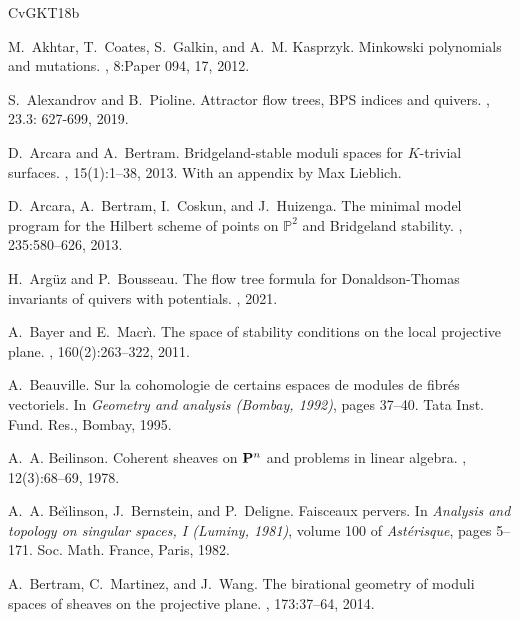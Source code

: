 \documentclass[12pt, a4paper]{amsart}
\begin{document}
\begin{thebibliography}{CvGKT18b}

M.~Akhtar, T.~Coates, S.~Galkin, and A.~M. Kasprzyk.
\newblock Minkowski polynomials and mutations.
, 8:Paper 094,
  17, 2012.
  
  
S.~Alexandrov and B.~Pioline.
\newblock Attractor flow trees, {BPS} indices and quivers.
, 23.3: 627-699, 2019.
  

 
D.~Arcara and A.~Bertram.
\newblock Bridgeland-stable moduli spaces for {$K$}-trivial surfaces.
, 15(1):1--38, 2013.
\newblock With an appendix by Max Lieblich.

D.~Arcara, A.~Bertram, I.~Coskun, and J.~Huizenga.
\newblock The minimal model program for the {H}ilbert scheme of points on
  {$\mathbb{P}^2$} and {B}ridgeland stability.
, 235:580--626, 2013.

H.~Arg{\"u}z and P.~Bousseau.
\newblock The flow tree formula for Donaldson-Thomas invariants of quivers with potentials.
, 2021.



A.~Bayer and E.~Macr\`\i.
\newblock The space of stability conditions on the local projective plane.
, 160(2):263--322, 2011.

A.~Beauville.
\newblock Sur la cohomologie de certains espaces de modules de fibr\'es
  vectoriels.
\newblock In {\em Geometry and analysis ({B}ombay, 1992)}, pages 37--40. Tata
  Inst. Fund. Res., Bombay, 1995.

A.~A. Beilinson.
\newblock Coherent sheaves on {${\bf P}\sp{n}$} and problems in linear algebra.
, 12(3):68--69, 1978.


A.~A. Be\u{\i}linson, J.~Bernstein, and P.~Deligne.
\newblock Faisceaux pervers.
\newblock In {\em Analysis and topology on singular spaces, {I} ({L}uminy,
  1981)}, volume 100 of {\em Ast\'{e}risque}, pages 5--171. Soc. Math. France,
  Paris, 1982.
  
A.~Bertram, C.~Martinez, and J.~Wang.
\newblock The birational geometry of moduli spaces of sheaves on the projective
  plane.
, 173:37--64, 2014.



\end{thebibliography}
\end{document}

